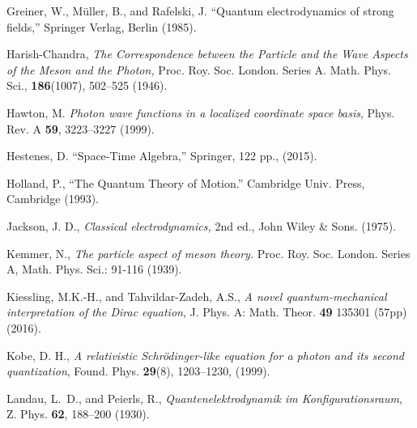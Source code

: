 \documentclass[11pt]{article}
\theoremstyle{definition}
\numberwithin{equation}{section}
\begin{document}
\begin{thebibliography}{[KTZ2020]}
  Greiner, W.,
  M\"uller, B.,
  and
  Rafelski, J.
  ``Quantum electrodynamics of strong fields,''
  Springer Verlag, Berlin (1985).\vspace{-4pt}

 Harish-Chandra,
 {\it The Correspondence between the Particle and the Wave Aspects of the Meson and the Photon,} 
 Proc. Roy. Soc. London. Series A. Math. Phys. Sci., {\bf 186}(1007), 502--525 (1946).\vspace{-4pt}

  Hawton, M.
  \textit{Photon wave functions in a localized coordinate space basis},
  Phys. Rev. A \textbf{59}, 3223--3227 (1999). \vspace{-4pt}

Hestenes, D. 
    ``Space-Time Algebra,''
  Springer, 122 pp.,  (2015).\vspace{-4pt}

 Holland, P.,
  ``The Quantum Theory of Motion.''
  Cambridge Univ. Press, Cambridge (1993).

  Jackson, J. D., 
 \textit{Classical electrodynamics,} 2nd ed., John Wiley \& Sons. (1975).\vspace{-4pt}

Kemmer, N., 
\textit{The particle aspect of meson theory.}
 Proc. Roy. Soc. London. Series A, Math. Phys. Sci.: 91-116 (1939).\vspace{-4pt}



 Kiessling, M.K.-H.,
 and
 Tahvildar-Zadeh, A.S.,
 \textit{A novel quantum-mechanical interpretation of the Dirac equation},
 J. Phys. A: Math. Theor. \textbf{49} 135301 (57pp) (2016).%

\newblock Kobe, D. H., 
\newblock \textit{A relativistic Schr\"odinger-like equation for a photon and its second quantization},
\newblock Found. Phys. \textbf{29}(8), 1203--1230, (1999).


  Landau, L.~D.,
  and 
  Peierls, R.,
  {\it Quantenelektrodynamik im Konfigurationsraum}, 
  Z. Phys. \textbf{62}, 188--200 (1930).\vspace{-4pt}


\end{thebibliography}
\end{document}
